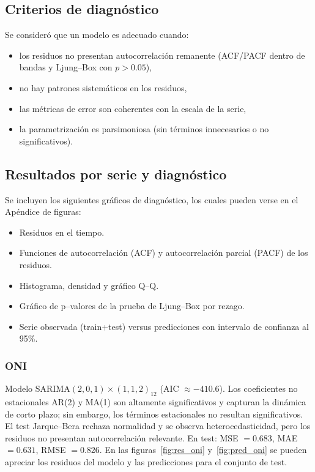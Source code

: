 \subsection{Criterios de diagnóstico}
Se consideró que un modelo es adecuado cuando:
\begin{itemize}
    \item los residuos no presentan autocorrelación remanente (ACF/PACF dentro de bandas y Ljung--Box con $p>0.05$),
    \item no hay patrones sistemáticos en los residuos,
    \item las métricas de error son coherentes con la escala de la serie,
    \item la parametrización es parsimoniosa (sin términos innecesarios o no significativos).
\end{itemize}

\subsection{Resultados por serie y diagnóstico}
Se incluyen los siguientes gráficos de diagnóstico, los cuales pueden verse en el Apéndice de figuras:

\begin{itemize}
    \item Residuos en el tiempo.  
    \item Funciones de autocorrelación (ACF) y autocorrelación parcial (PACF) de los residuos.  
    \item Histograma, densidad y gráfico Q--Q.  
    \item Gráfico de p--valores de la prueba de Ljung--Box por rezago.  
    \item Serie observada (train+test) versus predicciones con intervalo de confianza al 95\%.  
\end{itemize}

\subsubsection{ONI} 
Modelo SARIMA$(2,0,1)\times(1,1,2)_{12}$ (AIC $\approx -410.6$). 
Los coeficientes no estacionales AR(2) y MA(1) son altamente significativos y capturan la
dinámica de corto plazo; sin embargo, los términos estacionales no resultan
significativos. El test Jarque--Bera rechaza normalidad y se observa heterocedasticidad,
pero los residuos no presentan autocorrelación relevante. En test: 
MSE $=0.683$, MAE $=0.631$, RMSE $=0.826$. En las figuras~\ref{fig:res_oni} y~\ref{fig:pred_oni} se pueden apreciar los residuos del modelo y las predicciones para el conjunto de test.

